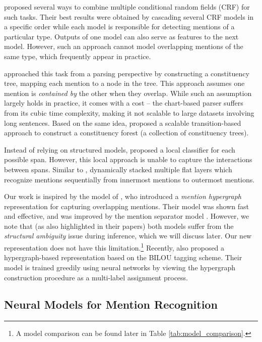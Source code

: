 \documentclass[11pt,a4paper]{article}
\theoremstyle{theorem}
\begin{document}
\citet{alex2007recognising} proposed several ways to combine multiple conditional random fields (CRF) \cite{lafferty2001conditional} for such tasks.
Their best results were obtained by cascading several CRF models in a specific order while each model is responsible for detecting mentions of a particular type.
Outputs of one model can also serve as features to the next model.
However, such an approach cannot model overlapping mentions of the same type, which frequently appear in practice.


\citet{finkel2009nested} approached this task from a parsing perspective by constructing a constituency tree, mapping each mention to a node in the tree.
This approach assumes one mention is {\em contained by} the other when they overlap.
While such an assumption largely holds in practice, it comes with a cost -- the chart-based parser suffers from its cubic time complexity, making it not scalable to large datasets involving long sentences.
Based on the same idea, \citet{nest-bw-em18} proposed a scalable transition-based approach to construct a constituency forest (a collection of constituency trees).


Instead of relying on structured models, \citet{xu2017local} proposed a local classifier for each possible span. 
However, this local approach is unable to capture the interactions between {\color{black}spans}.
Similar to \cite{alex2007recognising}, \citet{N18-1131} dynamically stacked multiple flat layers which recognize mentions sequentially from innermost mentions to outermost mentions.

Our work is inspired by the model of \citet{lu2015joint}, who introduced a {\em mention hypergraph} representation for capturing overlapping mentions.
Their model was shown fast and effective, and was improved by the mention separator model \cite{muis2017labeling}.
However, we note that (as also highlighted in their papers) both models suffer from the {\em structural ambiguity} issue during inference, which we will discuss later.
Our new  representation does not have this limitation.\footnote{A model comparison can be found later in Table \ref{tab:model_comparison}.}
Recently, \citet{N18-1079} also proposed a hypergraph-based representation based on the BILOU tagging scheme.
Their model is trained greedily using neural networks by viewing the hypergraph construction procedure as a multi-label assignment process. 


\subsection*{Neural Models for Mention Recognition}
\end{document}
